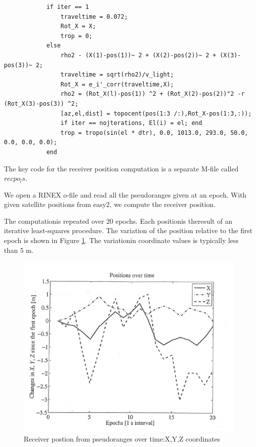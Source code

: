 		\begin{lstlisting}
			if iter == 1
				traveltime = 0.072;
				Rot_X = X;
				trop = 0;
			else
				rho2 - (X(1)-pos(1))~ 2 + (X(2)-pos(2))~ 2 + (X(3)-pos(3))~ 2;
				traveltime = sqrt(rho2)/v_light;
				Rot_X = e_i'_corr(traveltime,X);
				rho2 = (Rot_X(l)-pos(1)) ^2 + (Rot_X(2)-pos(2))"2 -r (Rot_X(3)-pos(3)) ^2;
				[az,el,dist] = topocent(pos(1:3 /:),Rot_X-pos(1:3,:));
				if iter == nojterations, El(i) = el; end
				trop = tropo(sin(el * dtr), 0.0, 1013.0, 293.0, 50.0, 0.0, 0.0, 0.0);
			end
		\end{lstlisting}
		The key code for the receiver position computation is a separate M-file called $recpo_ls$.
		
		We open a RINEX o-file and read all the pseudoranges given at an epoch. With given satellite positions from easy2, we compute the receiver position.
		
		The computationis repeated over 20 epochs. Each positionis theresult of an iterative least-squares procedure. The variation of the position relative to the first epoch is shown in Figure \ref{fig:9-14}. The variationin coordinate values is typically less than 5 m.
		\begin{figure}[h]
			\centering
			\includegraphics[width=0.7\linewidth]{TeX_files/Part03/chapter09/image/9-14}
			\caption{Receiver postion from pseudoranges over time:X,Y,Z coordinates}
			\label{fig:9-14}
		\end{figure}
		

